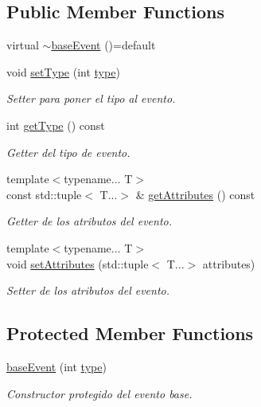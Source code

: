 \subsection*{Public Member Functions}
\begin{DoxyCompactItemize}
\item 
virtual \hyperlink{classant_1_1base_event_a53ce67f13ed29f0b2b28bbb13dad7ecf}{$\sim$base\+Event} ()=default
\item 
void \hyperlink{classant_1_1base_event_a6d6f1170cb6f01301d137d732c0f2704}{set\+Type} (int \hyperlink{classant_1_1base_event_a432df0c459b20666e81c53ffab82caf4}{type})
\begin{DoxyCompactList}\small\item\em Setter para poner el tipo al evento. \end{DoxyCompactList}\item 
int \hyperlink{classant_1_1base_event_ad6672f6ff1522b7b66ff7ae43613ed71}{get\+Type} () const 
\begin{DoxyCompactList}\small\item\em Getter del tipo de evento. \end{DoxyCompactList}\item 
{\footnotesize template$<$typename... T$>$ }\\const std\+::tuple$<$ T...$>$ \& \hyperlink{classant_1_1base_event_a3385b5a287d0f6af5d39a79af1c21862}{get\+Attributes} () const 
\begin{DoxyCompactList}\small\item\em Getter de los atributos del evento. \end{DoxyCompactList}\item 
{\footnotesize template$<$typename... T$>$ }\\void \hyperlink{classant_1_1base_event_a7724e30d398447f53442c6d915c521d5}{set\+Attributes} (std\+::tuple$<$ T...$>$ attributes)
\begin{DoxyCompactList}\small\item\em Setter de los atributos del evento. \end{DoxyCompactList}\end{DoxyCompactItemize}
\subsection*{Protected Member Functions}
\begin{DoxyCompactItemize}
\item 
\hyperlink{classant_1_1base_event_a54f4631555a56b376405a4bb8bdd839b}{base\+Event} (int \hyperlink{classant_1_1base_event_a432df0c459b20666e81c53ffab82caf4}{type})
\begin{DoxyCompactList}\small\item\em Constructor protegido del evento base. \end{DoxyCompactList}\end{DoxyCompactItemize}
